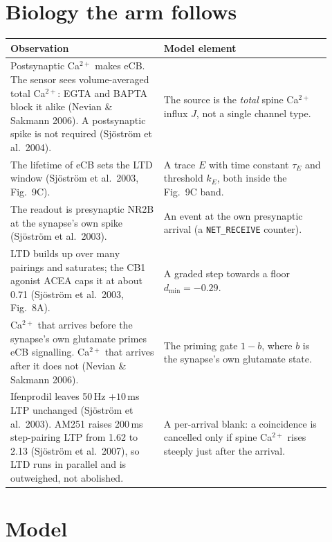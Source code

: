 \documentclass[11pt]{article}
\newcommand{\dmin}{d_{\min}}
\begin{document}
\section{Biology the arm follows}
\begin{center}
\small
\begin{tabular}{>{\raggedright}p{0.44\linewidth} >{\raggedright\arraybackslash}p{0.48\linewidth}}
\toprule
Observation & Model element \\
\midrule
Postsynaptic Ca$^{2+}$ makes eCB. The sensor sees volume-averaged total Ca$^{2+}$: EGTA and BAPTA block it alike
(Nevian \& Sakmann 2006). A postsynaptic spike is not required (Sj\"ostr\"om et al.\ 2004).
& The source is the \emph{total} spine Ca$^{2+}$ influx $J$, not a single channel type. \\[0.3em]
The lifetime of eCB sets the LTD window (Sj\"ostr\"om et al.\ 2003, Fig.~9C).
& A trace $E$ with time constant $\tau_E$ and threshold $k_E$, both inside the Fig.~9C band. \\[0.3em]
The readout is presynaptic NR2B at the synapse's own spike (Sj\"ostr\"om et al.\ 2003).
& An event at the own presynaptic arrival (a \texttt{NET\_RECEIVE} counter). \\[0.3em]
LTD builds up over many pairings and saturates; the CB1 agonist ACEA caps it at about 0.71
(Sj\"ostr\"om et al.\ 2003, Fig.~8A).
& A graded step towards a floor $\dmin=-0.29$. \\[0.3em]
Ca$^{2+}$ that arrives before the synapse's own glutamate primes eCB signalling. Ca$^{2+}$ that arrives after it does
not (Nevian \& Sakmann 2006).
& The priming gate $1-b$, where $b$ is the synapse's own glutamate state. \\[0.3em]
Ifenprodil leaves 50\,Hz $+10$\,ms LTP unchanged (Sj\"ostr\"om et al.\ 2003). AM251 raises 200\,ms step-pairing LTP from
1.62 to 2.13 (Sj\"ostr\"om et al.\ 2007), so LTD runs in parallel and is outweighed, not abolished.
& A per-arrival blank: a coincidence is cancelled only if spine Ca$^{2+}$ rises steeply just after the arrival. \\
\bottomrule
\end{tabular}
\end{center}

\section{Model}
\end{document}
